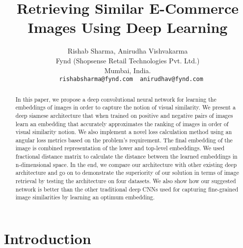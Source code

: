 \documentclass[10pt,twocolumn,letterpaper]{article}
\begin{document}
\title{\LARGE \bf
Retrieving Similar E-Commerce Images Using Deep Learning}

\author{Rishab Sharma,  Anirudha Vishvakarma\\
	Fynd (Shopsense Retail Technologies Pvt. Ltd.)\\ Mumbai, India.\\
	{\tt\small ~~rishabsharma@fynd.com~~anirudhav@fynd.com}\\  \vspace{-1mm}	
}
\maketitle




\begin{abstract}\vspace{-3mm}
In this paper, we propose a deep convolutional neural network for learning the embeddings of images in order to capture the notion of visual similarity. We present a deep siamese architecture that when trained on positive and negative pairs of images learn an embedding that accurately approximates the ranking of images in order of visual similarity notion. We also implement a novel loss calculation method using an angular loss metrics based on the problem’s requirement. The final embedding of the image is combined representation of the lower and top-level embeddings. We used fractional distance matrix to calculate the distance between the learned embeddings in n-dimensional space. In the end, we compare our architecture with other existing deep architecture and go on to demonstrate the superiority of our solution in terms of image retrieval by testing the architecture on four datasets. We also show how our suggested network is better than the other traditional deep CNNs used for capturing fine-grained image similarities by learning an optimum embedding.
\end{abstract}

\vspace{-4mm}
\section{Introduction}\vspace{-1mm}
\end{document}
